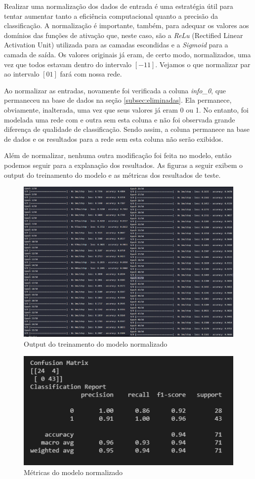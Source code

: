 \documentclass[12pt]{article}
\begin{document}
Realizar uma normalização dos dados de entrada é uma estratégia útil para tentar aumentar tanto a eficiência computacional quanto a precisão da classificação. A normalização é importante, também, para adequar os valores aos domínios das funções de ativação que, neste caso, são a \textit{ReLu} (Rectified Linear Activation Unit) utilizada para as camadas escondidas e a \textit{Sigmoid} para a camada de saída. Os valores originais já eram, de certo modo, normalizados, uma vez que todos estavam dentro do intervalo $[-1 1]$. Vejamos o que normalizar par ao intervalo $[0 1]$ fará com nossa rede.

Ao normalizar as entradas, novamente foi verificada a coluna \textit{info\_0}, que permaneceu na base de dados na seção \ref{subsec:eliminadas}. Ela permanece, obviamente, inalterada, uma vez que seus valores já eram 0 ou 1. No entanto, foi modelada uma rede com e outra sem esta coluna e não foi observada grande diferença de qualidade de classificação. Sendo assim, a coluna permanece na base de dados e os resultados para a rede sem esta coluna não serão exibidos.

Além de normalizar, nenhuma outra modificação foi feita no modelo, então podemos seguir para a explanação dos resultados. As figuras a seguir exibem o output do treinamento do modelo e as métricas dos resultados de teste.

\begin{figure}[H]
	\centering
	\includegraphics[width=1.1\linewidth]{Imagens/Fit_Normalizada}
	\caption{Output do treinamento do modelo normalizado}
	\label{fig:fitnormalizada}
\end{figure}
\begin{figure}[H]
	\centering
	\includegraphics[width=0.7\linewidth]{Imagens/resultadoNormalizada}
	\caption{Métricas do modelo normalizado}
	\label{fig:resultadonormalizada}
\end{figure}
\end{document}
